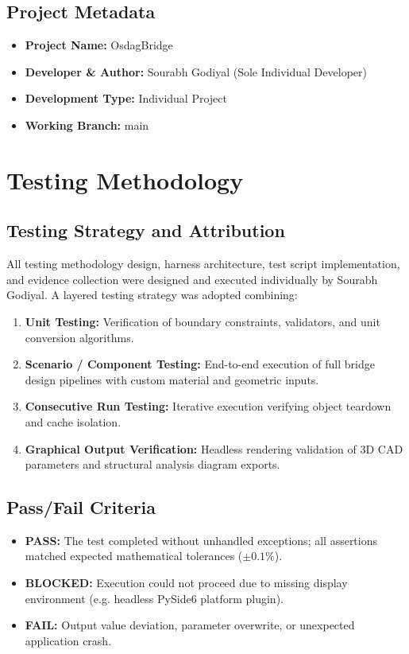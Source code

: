 \documentclass[11pt,a4paper]{report}
\begin{document}
\section{Project Metadata}
\begin{itemize}
    \item \textbf{Project Name:} OsdagBridge
    \item \textbf{Developer \& Author:} Sourabh Godiyal (Sole Individual Developer)
    \item \textbf{Development Type:} Individual Project
    \item \textbf{Working Branch:} main
\end{itemize}

\chapter{Testing Methodology}
\section{Testing Strategy and Attribution}
All testing methodology design, harness architecture, test script implementation, and evidence collection were designed and executed individually by Sourabh Godiyal. A layered testing strategy was adopted combining:
\begin{enumerate}
    \item \textbf{Unit Testing:} Verification of boundary constraints, validators, and unit conversion algorithms.
    \item \textbf{Scenario / Component Testing:} End-to-end execution of full bridge design pipelines with custom material and geometric inputs.
    \item \textbf{Consecutive Run Testing:} Iterative execution verifying object teardown and cache isolation.
    \item \textbf{Graphical Output Verification:} Headless rendering validation of 3D CAD parameters and structural analysis diagram exports.
\end{enumerate}

\section{Pass/Fail Criteria}
\begin{itemize}
    \item \textbf{PASS:} The test completed without unhandled exceptions; all assertions matched expected mathematical tolerances ($\pm 0.1\%$).
    \item \textbf{BLOCKED:} Execution could not proceed due to missing display environment (e.g. headless PySide6 platform plugin).
    \item \textbf{FAIL:} Output value deviation, parameter overwrite, or unexpected application crash.
\end{itemize}
\end{document}
